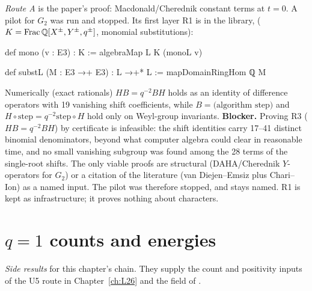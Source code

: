 \begin{warning}[title={The stopped Route A pilot for $G_2$}]
\emph{Route A} is the paper's proof: Macdonald/Cherednik constant terms at $t=0$. A pilot for $G_2$ was run and
stopped. Its first layer R1 is in the library, 
($K=\mathrm{Frac}\,{\mathbb{Q}}[X^{\pm},Y^{\pm},q^{\pm}]$, monomial substitutions):
\begin{leancode}
def mono (v : E3) : K := algebraMap L K (monoL v)

def substL (M : E3 →+ E3) : L →+* L := mapDomainRingHom ℚ M
\end{leancode}
Numerically (exact rationals) $HB=q^{-2}BH$ holds as an identity of difference operators with 19 vanishing shift
coefficients, while $B=\text{(algorithm step)}$ and $H\circ\text{step}=q^{-2}\text{step}\circ H$ hold only on
Weyl-group invariants. \textbf{Blocker.} Proving R3 ($HB=q^{-2}BH$) by certificate is infeasible: the shift identities
carry 17--41 distinct binomial denominators, beyond what computer algebra could clear in reasonable time, and no
small vanishing subgroup was found among the 28 terms of the single-root shifts. The only viable proofs are
structural (DAHA/Cherednik $Y$-operators for $G_2$) or a citation of the literature (van Diejen--Emsiz plus Chari--Ion)
as a named input. The pilot was therefore stopped, and  stays named. R1 is kept as infrastructure;
it proves nothing about characters.
\end{warning}

\section{\texorpdfstring{$q=1$}{q=1} counts and energies}\label{l25:sec:counts}

\noindent\emph{Side results} for this chapter's chain. They supply the count and positivity inputs of the U5 route in
Chapter~\ref{ch:L26} and the  field of .

